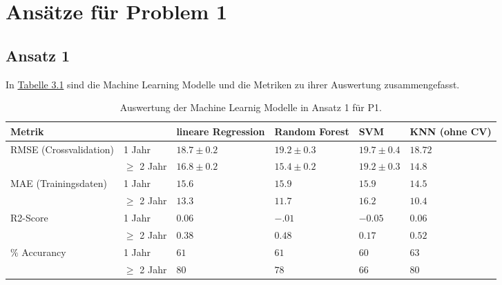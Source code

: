 \section{Ans\"atze f\"ur Problem 1}


\subsection{Ansatz 1}
In \hyperref[tab:ergebnisA1P1]{Tabelle 3.1} sind die Machine Learning Modelle und die Metriken zu ihrer Auswertung zusammengefasst.

\begin{table}[ht]
  \caption{\label{tab:ergebnisA1P1} Auswertung der Machine Learnig Modelle in Ansatz 1 f\"ur P1.}
  \begin{tabular}{ p{3cm} p{2cm} p{2cm} p{2cm} p{2cm} p{1.5cm} }
    \toprule
    Metrik &               & lineare Regression & Random Forest  & SVM            & KNN (ohne CV) \\
    \midrule
    \multirow{2}{3em}{RMSE (Crossvalidation)}
           & 1 Jahr        & $18.7 \pm 0.2$     & $19.2 \pm 0.3$ & $19.7 \pm 0.4$ & $18.72$       \\
           & $\geq$ 2 Jahr & $16.8 \pm 0.2$     & $15.4 \pm 0.2$ & $19.2 \pm 0.3$ & $14.8$        \\

    \midrule
    \multirow{2}{3em}{MAE (Trainingsdaten)}
           & 1 Jahr        & $15.6$             & $15.9$         & $15.9$         & $14.5$        \\
           & $\geq$ 2 Jahr & $13.3$             & $11.7$         & $16.2$         & $10.4$        \\

    \midrule
    \multirow{2}{3em}{R2-Score}
           & 1 Jahr        & $0.06$             & $-.01$         & $-0.05$        & $0.06$        \\
           & $\geq$ 2 Jahr & $0.38$             & $0.48$         & $0.17$         & $0.52$        \\

    \midrule
    \multirow{2}{3em}{$\%$ Accurancy}
           & 1 Jahr        & $61$               & $61$           & $60$           & $63$          \\
           & $\geq$ 2 Jahr & $80$               & $78$           & $66$           & $80$          \\

    \bottomrule
  \end{tabular}
\end{table}

